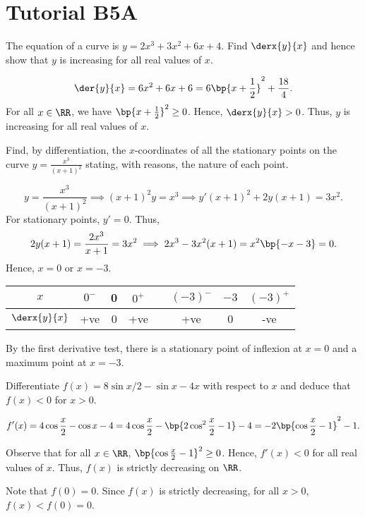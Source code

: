 \section{Tutorial B5A}

\begin{problem}
    The equation of a curve is $y=2x^3+3x^2+6x+4$. Find $\derx{y}{x}$ and hence show that $y$ is increasing for all real values of $x$.
\end{problem}
\begin{solution}
    \[\der{y}{x} = 6x^2+6x+6 = 6\bp{x + \frac12}^2 + \frac{18}4.\] For all $x \in \RR$, we have $\bp{x + \frac12}^2 \geq 0$. Hence, $\derx{y}{x} > 0$. Thus, $y$ is increasing for all real values of $x$.
\end{solution}

\begin{problem}
    Find, by differentiation, the $x$-coordinates of all the stationary points on the curve $y = \frac{x^3}{(x+1)^2}$ stating, with reasons, the nature of each point.
\end{problem}
\begin{solution}
    \[y = \frac{x^3}{(x+1)^2} \implies (x+1)^2y =x^3 \implies y'(x+1)^2 + 2y(x+1) = 3x^2.\] For stationary points, $y' = 0$. Thus, \[2y(x+1) = \frac{2x^3}{x+1} = 3x^2 \implies 2x^3 - 3x^2 (x+1) = x^2\bp{-x - 3} = 0.\] Hence, $x = 0$ or $x = -3$.

    \begin{table}[H]
        \centering
        \begin{tabular}{|c|c|c|c|c|c|c|c|}
        \hline
        $x$          & $0^-$ & 0 & $0^+$ & \hspace{-1em} & $(-3)^-$ & $-3$ & $(-3)^+$ \\\hline
        $\derx{y}{x}$ & +ve   & 0 & +ve  & \hspace{-1em} & +ve   & 0 & -ve \\\hline
        \end{tabular}
    \end{table}

    By the first derivative test, there is a stationary point of inflexion at $x = 0$ and a maximum point at $x=-3$.
\end{solution}

\begin{problem}
    Differentiate $f(x) = 8\sin{x/2} - \sin x - 4x$ with respect to $x$ and deduce that $f(x) < 0$ for $x>0$.
\end{problem}
\begin{solution}
    \[f'(x) = 4\cos \frac{x}2 - \cos x - 4 = 4\cos \frac{x}2 - \bp{2\cos^2 \frac{x}2 - 1} - 4 = -2\bp{\cos\frac{x}2 - 1}^2 - 1.\]

    Observe that for all $x \in \RR$, $\bp{\cos\frac{x}2 - 1}^2 \geq 0$. Hence, $f'(x) < 0$ for all real values of $x$. Thus, $f(x)$ is strictly decreasing on $\RR$.

    Note that $f(0) = 0$. Since $f(x)$ is strictly decreasing, for all $x > 0$, $f(x) < f(0) = 0$.
\end{solution}

